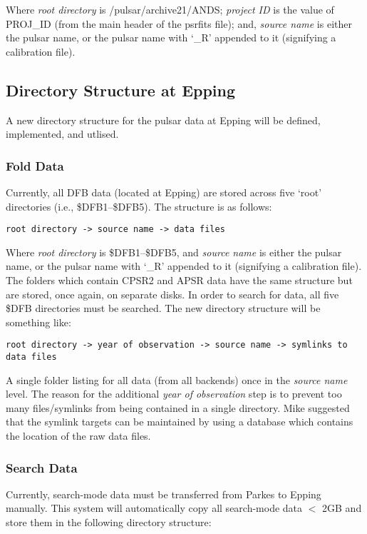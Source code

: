 \documentclass{article}
\begin{document}
Where \emph{root directory} is /pulsar/archive21/ANDS; \emph{project ID} is the value of PROJ\_ID (from the main header of the psrfits file); and, \emph{source name} is either the pulsar name, or the pulsar name with `\_R' appended to it (signifying a calibration file).

\subsection{Directory Structure at Epping}
A new directory structure for the pulsar data at Epping will be defined, implemented, and utlised.

\subsubsection{Fold Data}
Currently, all DFB data (located at Epping) are stored across five `root' directories (i.e., \$DFB1--\$DFB5). The structure is as follows:

\begin{verbatim}
root directory -> source name -> data files
\end{verbatim}

Where \emph{root directory} is \$DFB1--\$DFB5, and \emph{source name} is either the pulsar name, or the pulsar name with `\_R' appended to it (signifying a calibration file). The folders which contain CPSR2 and APSR data have the same structure but are stored, once again, on separate disks. In order to search for data, all five \$DFB directories must be searched. The new directory structure will be something like:

\begin{verbatim}
root directory -> year of observation -> source name -> symlinks to data files
\end{verbatim}

A single folder listing for all data (from all backends) once in the \emph{source name} level. The reason for the additional \emph{year of observation} step is to prevent too many files/symlinks from being contained in a single directory. Mike suggested that the symlink targets can be maintained by using a database which contains the location of the raw data files.

\subsubsection{Search Data}
Currently, search-mode data must be transferred from Parkes to Epping manually. This system will automatically copy all search-mode data $<$ 2GB and store them in the following directory structure:
\end{document}
